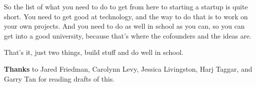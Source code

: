 So the list of what you need to do to get from here to starting a
startup is quite short. You need to get good at technology, and the way
to do that is to work on your own projects. And you need to do as well
in school as you can, so you can get into a good university, because
that's where the cofounders and the ideas are.

That's it, just two things, build stuff and do well in school.


\textbf{Thanks} to Jared Friedman, Carolynn Levy, Jessica Livingston,
Harj Taggar, and Garry Tan for reading drafts of this.